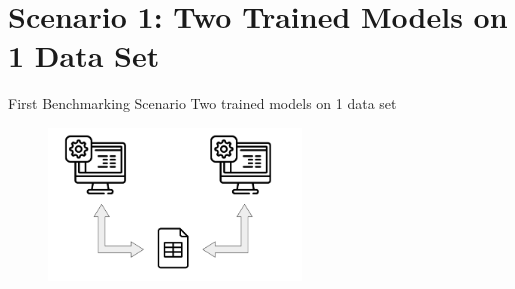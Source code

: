 \documentclass[11pt,compress,t,notes=noshow, aspectratio=169, xcolor=table]{beamer}
\begin{document}









\section{Scenario 1: Two Trained Models on 1 Data Set}
\begin{frame}{First Benchmarking Scenario}
\vfill
\centering
\large{Two trained models on 1 data set}
    \begin{figure}
        \includegraphics[width = 0.6\textwidth]{figure/2algos_1dataset.png}
    \end{figure}
\vfill
\end{frame}
\end{document}
